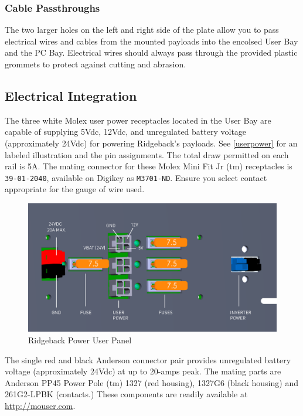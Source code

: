 \documentclass[]{clearpath-latex/clearpath-manual}
\begin{document}
\subsubsection{Cable Passthroughs}

The two larger holes on the left and right side of the plate allow you to pass electrical wires and cables from the mounted payloads into the encolsed User Bay and the PC Bay.  Electrical wires should always pass through the provided plastic grommets to protect against cutting and abrasion.

\pagebreak[4]
\subsection{Electrical Integration}
\label{electrical}

The three white Molex user power receptacles located in the User Bay are capable of supplying 5Vdc, 12Vdc, and unregulated battery voltage (approximately 24Vdc) for powering Ridgeback's payloads. See \autoref{userpower} for an labeled illustration and the pin assignments. The total draw permitted on each rail is 5A. The mating connector for these Molex Mini Fit Jr (tm) receptacles is \lstinline{39-01-2040}, available on Digikey as \lstinline{M3701-ND}. Ensure you select contact appropriate for the gauge of wire used.

\begin{figure}[!h]
  \centering
  \includegraphics[width=1.0\linewidth]{Ridgeback_UserPower_SOLID.pdf}
  \caption{Ridgeback Power User Panel}
  \label{userpower}
\end{figure}

The single red and black Anderson connector pair provides unregulated battery voltage (approximately 24Vdc) at up to 20-amps peak. The mating parts are Anderson PP45 Power Pole (tm) 1327 (red housing), 1327G6 (black housing) and 261G2-LPBK (contacts.) These components are readily available at \url{http://mouser.com}.
\end{document}
